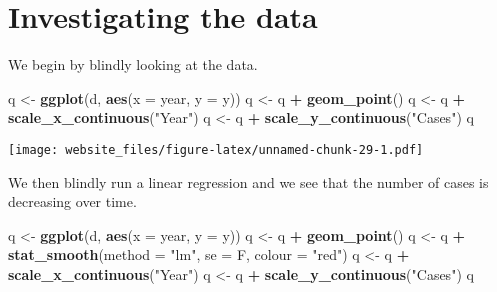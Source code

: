 \documentclass[]{book}
\newenvironment{Shaded}{\begin{snugshade}}{\end{snugshade}}
\newcommand{\KeywordTok}[1]{\textcolor[rgb]{0.13,0.29,0.53}{\textbf{#1}}}
\newcommand{\DataTypeTok}[1]{\textcolor[rgb]{0.13,0.29,0.53}{#1}}
\newcommand{\StringTok}[1]{\textcolor[rgb]{0.31,0.60,0.02}{#1}}
\newcommand{\OperatorTok}[1]{\textcolor[rgb]{0.81,0.36,0.00}{\textbf{#1}}}
\newcommand{\NormalTok}[1]{#1}
\begin{document}
\newpage

\section{Investigating the data}\label{investigating-the-data}

We begin by blindly looking at the data.

\begin{Shaded}
\begin{Highlighting}[]
\NormalTok{q <-}\StringTok{ }\KeywordTok{ggplot}\NormalTok{(d, }\KeywordTok{aes}\NormalTok{(}\DataTypeTok{x =}\NormalTok{ year, }\DataTypeTok{y =}\NormalTok{ y))}
\NormalTok{q <-}\StringTok{ }\NormalTok{q }\OperatorTok{+}\StringTok{ }\KeywordTok{geom_point}\NormalTok{()}
\NormalTok{q <-}\StringTok{ }\NormalTok{q }\OperatorTok{+}\StringTok{ }\KeywordTok{scale_x_continuous}\NormalTok{(}\StringTok{"Year"}\NormalTok{)}
\NormalTok{q <-}\StringTok{ }\NormalTok{q }\OperatorTok{+}\StringTok{ }\KeywordTok{scale_y_continuous}\NormalTok{(}\StringTok{"Cases"}\NormalTok{)}
\NormalTok{q}
\end{Highlighting}
\end{Shaded}

\texttt{[image: website\_files/figure-latex/unnamed-chunk-29-1.pdf]}

We then blindly run a linear regression and we see that the number of
cases is decreasing over time.

\begin{Shaded}
\begin{Highlighting}[]
\NormalTok{q <-}\StringTok{ }\KeywordTok{ggplot}\NormalTok{(d, }\KeywordTok{aes}\NormalTok{(}\DataTypeTok{x =}\NormalTok{ year, }\DataTypeTok{y =}\NormalTok{ y))}
\NormalTok{q <-}\StringTok{ }\NormalTok{q }\OperatorTok{+}\StringTok{ }\KeywordTok{geom_point}\NormalTok{()}
\NormalTok{q <-}\StringTok{ }\NormalTok{q }\OperatorTok{+}\StringTok{ }\KeywordTok{stat_smooth}\NormalTok{(}\DataTypeTok{method =} \StringTok{"lm"}\NormalTok{, }\DataTypeTok{se =}\NormalTok{ F, }\DataTypeTok{colour =} \StringTok{"red"}\NormalTok{)}
\NormalTok{q <-}\StringTok{ }\NormalTok{q }\OperatorTok{+}\StringTok{ }\KeywordTok{scale_x_continuous}\NormalTok{(}\StringTok{"Year"}\NormalTok{)}
\NormalTok{q <-}\StringTok{ }\NormalTok{q }\OperatorTok{+}\StringTok{ }\KeywordTok{scale_y_continuous}\NormalTok{(}\StringTok{"Cases"}\NormalTok{)}
\NormalTok{q}
\end{Highlighting}
\end{Shaded}
\end{document}
